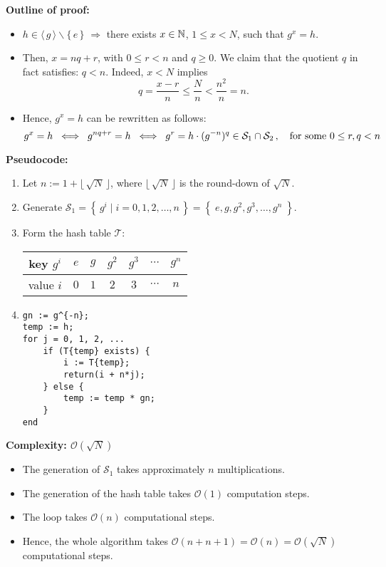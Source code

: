 \noindent
\textbf{Outline of proof:}
\begin{itemize}
\item	$h \in \langle\,g\,\rangle \backslash \{\,e\,\}$ $\Longrightarrow$ there exists $x \in \mathbb{N}$, $1 \leq x < N$, such that $g^{x} = h$.
\item 	Then, $x = nq + r$, with $0 \leq r < n$ and $q \geq 0$. We claim that the quotient $q$ in fact satisfies: $q < n$.
		Indeed, $x < N$ implies
		\begin{equation*}
		q = \dfrac{x - r}{n} \leq \dfrac{N}{n} < \dfrac{n^{2}}{n} = n.
		\end{equation*}
\item	Hence, $g^{x} = h$ can be rewritten as follows:
		\begin{equation*}
		g^{x} = h
		\;\;\Longleftrightarrow\;\; g^{nq+r} = h
		\;\;\Longleftrightarrow\;\; g^{r} = h\cdot(g^{-n})^{q} \in \mathcal{S}_{1}\cap\mathcal{S}_{2}\,,
		\quad
		\textnormal{for some $0\leq r,q < n$}
		\end{equation*}
\end{itemize}

\noindent
\textbf{Pseudocode:}
\begin{enumerate}
\item	Let $n := 1 + \lfloor\,\sqrt{N}\,\rfloor$, where $\lfloor\,\sqrt{N}\,\rfloor$ is the round-down of $\sqrt{N}$.
\item	Generate $\mathcal{S}_{1} = \left\{\,g^{i}\;\vert\;i = 0,1,2,\ldots,n\,\right\}=\left\{\;e, g, g^{2}, g^{3}, \ldots, g^{n}\;\right\}$.
\item	Form the hash table $\mathcal{T}$:
		\begin{center}
		\begin{tabular}{|c||c|c|c|c|c|c|}
		\hline
		key $g^{i}$ & $e$ & $g$ & $g^{2}$ & $g^{3}$ & $\cdots$ & $g^{n}$ \\
		\hline
		value $i$    & $0$ & $1$ & $2$ & $3$ & $\cdots$ & $n$ \\
		\hline
		\end{tabular}
		\end{center}
\item	\begin{verbatim}
gn := g^{-n};
temp := h;
for j = 0, 1, 2, ...
    if (T{temp} exists) {
        i := T{temp};
        return(i + n*j);
    } else {
        temp := temp * gn;
    }
end
		\end{verbatim}
\end{enumerate}

\noindent
\textbf{Complexity: $\mathcal{O}(\sqrt{N})$}
\begin{itemize}
\item	The generation of $\mathcal{S}_{1}$ takes approximately $n$ multiplications.
\item	The generation of the hash table takes $\mathcal{O}(1)$ computation steps.
\item	The loop takes $\mathcal{O}(n)$ computational steps.
\item	Hence, the whole algorithm takes $\mathcal{O}(n+n+1) = \mathcal{O}(n) = \mathcal{O}(\sqrt{N})$ computational steps.
\end{itemize}

